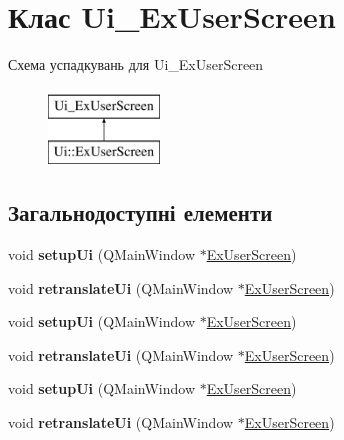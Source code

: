 \hypertarget{classUi__ExUserScreen}{\section{Клас Ui\-\_\-\-Ex\-User\-Screen}
\label{classUi__ExUserScreen}
}
Схема успадкувань для Ui\-\_\-\-Ex\-User\-Screen\begin{figure}[H]
\begin{center}
\leavevmode
\includegraphics[height=2.000000cm]{classUi__ExUserScreen}
\end{center}
\end{figure}
\subsection*{Загальнодоступні елементи}
\begin{DoxyCompactItemize}
\item 
\hypertarget{classUi__ExUserScreen_a166ae2661d465ac77a86487c3a394fcb}{void {\bfseries setup\-Ui} (Q\-Main\-Window $\ast$\hyperlink{classExUserScreen}{Ex\-User\-Screen})}\label{classUi__ExUserScreen_a166ae2661d465ac77a86487c3a394fcb}

\item 
\hypertarget{classUi__ExUserScreen_a4cc3648836b29adf36758dcff29d6761}{void {\bfseries retranslate\-Ui} (Q\-Main\-Window $\ast$\hyperlink{classExUserScreen}{Ex\-User\-Screen})}\label{classUi__ExUserScreen_a4cc3648836b29adf36758dcff29d6761}

\item 
\hypertarget{classUi__ExUserScreen_a166ae2661d465ac77a86487c3a394fcb}{void {\bfseries setup\-Ui} (Q\-Main\-Window $\ast$\hyperlink{classExUserScreen}{Ex\-User\-Screen})}\label{classUi__ExUserScreen_a166ae2661d465ac77a86487c3a394fcb}

\item 
\hypertarget{classUi__ExUserScreen_a4cc3648836b29adf36758dcff29d6761}{void {\bfseries retranslate\-Ui} (Q\-Main\-Window $\ast$\hyperlink{classExUserScreen}{Ex\-User\-Screen})}\label{classUi__ExUserScreen_a4cc3648836b29adf36758dcff29d6761}

\item 
\hypertarget{classUi__ExUserScreen_a166ae2661d465ac77a86487c3a394fcb}{void {\bfseries setup\-Ui} (Q\-Main\-Window $\ast$\hyperlink{classExUserScreen}{Ex\-User\-Screen})}\label{classUi__ExUserScreen_a166ae2661d465ac77a86487c3a394fcb}

\item 
\hypertarget{classUi__ExUserScreen_a4cc3648836b29adf36758dcff29d6761}{void {\bfseries retranslate\-Ui} (Q\-Main\-Window $\ast$\hyperlink{classExUserScreen}{Ex\-User\-Screen})}\label{classUi__ExUserScreen_a4cc3648836b29adf36758dcff29d6761}

\end{DoxyCompactItemize}
